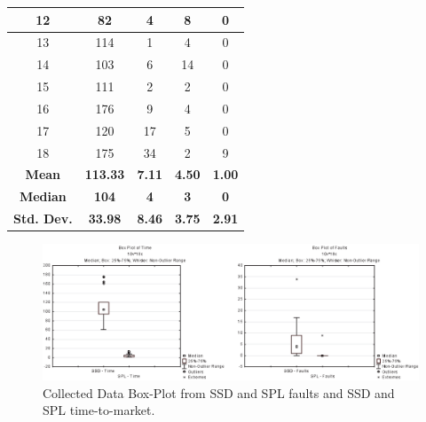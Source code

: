 \begin{table}[!ht]
\begin{tabular}{c|c|c|c|c}
12                                  & 82              & 4               & 8              & 0                                              \\ \hline
13                                  & 114             & 1               & 4              & 0                                             \\ \hline
14                                  & 103             & 6               & 14             & 0                                            \\ \hline
15                                  & 111             & 2               & 2              & 0                                              \\ \hline
16                                  & 176             & 9               & 4              & 0                                              \\ \hline
17                                  & 120             & 17              & 5              & 0                                             \\ \hline
18                                  & 175             & 34              & 2              & 9                                              \\ \hline
\textbf{Mean}                       & \textbf{113.33} & \textbf{7.11}   & \textbf{4.50}  & \textbf{1.00}                 \\ \cline{1-5}
\textbf{Median}                     & \textbf{104}    & \textbf{4}      & \textbf{3}     & \textbf{0}                                      \\ \cline{1-5}
\textbf{Std. Dev.}                  & \textbf{33.98}  & \textbf{8.46}   & \textbf{3.75}  & \textbf{2.91}                             \\ \hline
\end{tabular}
\end{table}


\begin{figure}[!ht]
\centering
\includegraphics[scale=1.0]{./figures/section4/boxplot.eps}
\centering
\caption{Collected Data Box-Plot from SSD and SPL faults and SSD and SPL time-to-market.}
\label{fig:boxplot}
\end{figure}

